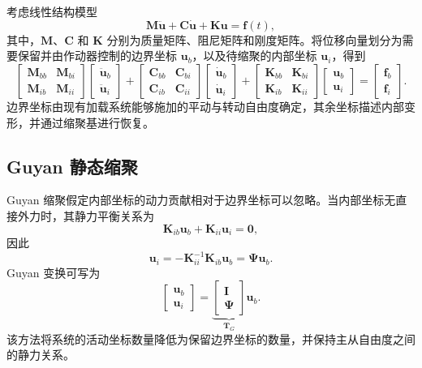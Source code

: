 \documentclass[UTF8,11pt,a4paper]{ctexart}
\begin{document}
考虑线性结构模型
\begin{equation}
\bm M\ddot{\bm u}+\bm C\dot{\bm u}+\bm K\bm u=\bm f(t),
\label{eq:full}
\end{equation}
其中，$\bm M$、$\bm C$ 和 $\bm K$ 分别为质量矩阵、阻尼矩阵和刚度矩阵。将位移向量划分为需要保留并由作动器控制的边界坐标 $\bm u_b$，以及待缩聚的内部坐标 $\bm u_i$，得到
\begin{equation}
\begin{bmatrix}
\bm M_{bb}&\bm M_{bi}\\
\bm M_{ib}&\bm M_{ii}
\end{bmatrix}
\begin{bmatrix}\ddot{\bm u}_b\\\ddot{\bm u}_i\end{bmatrix}
+
\begin{bmatrix}
\bm C_{bb}&\bm C_{bi}\\
\bm C_{ib}&\bm C_{ii}
\end{bmatrix}
\begin{bmatrix}\dot{\bm u}_b\\\dot{\bm u}_i\end{bmatrix}
+
\begin{bmatrix}
\bm K_{bb}&\bm K_{bi}\\
\bm K_{ib}&\bm K_{ii}
\end{bmatrix}
\begin{bmatrix}\bm u_b\\\bm u_i\end{bmatrix}
=
\begin{bmatrix}\bm f_b\\\bm f_i\end{bmatrix}.
\label{eq:partition}
\end{equation}
边界坐标由现有加载系统能够施加的平动与转动自由度确定，其余坐标描述内部变形，并通过缩聚基进行恢复。

\subsection{Guyan 静态缩聚}

Guyan 缩聚假定内部坐标的动力贡献相对于边界坐标可以忽略。当内部坐标无直接外力时，其静力平衡关系为
\begin{equation}
\bm K_{ib}\bm u_b+\bm K_{ii}\bm u_i=\bm 0,
\end{equation}
因此
\begin{equation}
\bm u_i=-\bm K_{ii}^{-1}\bm K_{ib}\bm u_b=\bm\Psi\bm u_b.
\label{eq:guyanrelation}
\end{equation}
Guyan 变换可写为
\begin{equation}
\begin{bmatrix}\bm u_b\\\bm u_i\end{bmatrix}
=\underbrace{\begin{bmatrix}\bm I\\\bm\Psi\end{bmatrix}}_{\bm T_G}\bm u_b.
\label{eq:TG}
\end{equation}
该方法将系统的活动坐标数量降低为保留边界坐标的数量，并保持主从自由度之间的静力关系。
\end{document}
